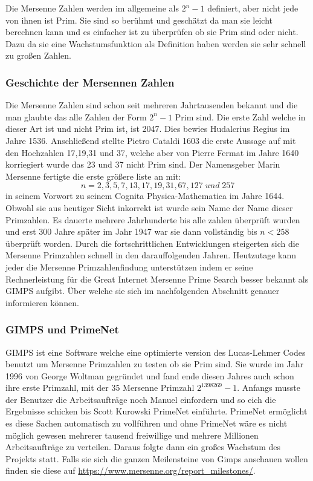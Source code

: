 Die Mersenne Zahlen werden im allgemeine als $2^{n}-1 $ definiert, aber nicht jede von ihnen ist Prim. Sie sind so berühmt und geschätzt da man sie leicht berechnen kann und es einfacher ist zu überprüfen ob sie Prim sind oder nicht. Dazu da sie eine Wachstumsfunktion als Definition haben werden sie sehr schnell zu großen Zahlen.
\subsubsection{Geschichte der Mersennen Zahlen}
Die Mersenne Zahlen sind schon seit mehreren Jahrtausenden bekannt und die man glaubte das alle Zahlen der Form $2^{n}-1$ Prim sind. Die erste Zahl welche in dieser Art ist und nicht Prim ist, ist 2047. Dies bewies Hudalcrius Regius im Jahre 1536. Anschließend stellte Pietro Cataldi 1603 die erste Aussage auf mit den Hochzahlen 17,19,31 und 37, welche aber von Pierre Fermat im Jahre 1640 korriegiert wurde das 23 und 37 nicht Prim sind. Der Namensgeber Marin Mersenne fertigte die erste größere liste an mit: 
\[n=2,3,5,7,13,17,19,31,67,127\; und\; 257\]
in seinem Vorwort zu seinem Cognita Physica-Mathematica im Jahre 1644.
Obwohl sie aus heutiger Sicht inkorrekt ist wurde sein Name der Name dieser Primzahlen. Es dauerte mehrere Jahrhunderte bis alle zahlen überprüft wurden und erst 300 Jahre später im Jahr 1947 war sie dann vollständig bis $n<258$ überprüft worden. Durch die fortschrittlichen Entwicklungen steigerten sich die Mersenne Primzahlen schnell in den darauffolgenden Jahren. Heutzutage kann jeder die Mersenne Primzahlenfindung unterstützen indem er seine Rechnerleistung für die Great Internet Mersenne Prime Search besser bekannt als GIMPS aufgibt.
Über welche sie sich im nachfolgenden Abschnitt genauer informieren können.
\subsubsection{GIMPS und PrimeNet}
GIMPS ist eine Software welche eine optimierte version des Lucas-Lehmer Codes benutzt um Mersenne Primzahlen zu testen ob sie Prim sind. Sie wurde im Jahr 1996 von George Woltman gegründet und fand ende diesen Jahres auch schon ihre erste Primzahl, mit der 35 Mersenne Primzahl $2^{1398269}-1$. Anfangs musste der Benutzer die Arbeitsaufträge noch Manuel einfordern und so eich die Ergebnisse schicken bis Scott Kurowski PrimeNet einführte. PrimeNet ermöglicht es diese Sachen automatisch zu vollführen und ohne PrimeNet wäre es nicht möglich gewesen mehrerer tausend freiwillige und mehrere Millionen Arbeitsaufträge zu verteilen. Daraus folgte dann ein großes Wachstum des Projekts statt. Falls sie sich die ganzen Meilensteine von Gimps anschauen wollen finden sie diese auf \url{https://www.mersenne.org/report_milestones/}.
\newpage 
